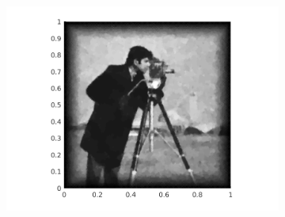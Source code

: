 \begin{figure}[!ht]
\begin{subfigure}{.3\linewidth}
    \includegraphics[trim = 60 20 60 20, clip, width=\linewidth]
      {pictures/introBeta/snr10/02500.png}
    \label{fig:snr10alpha2500}
  \end{subfigure}


\end{figure}
